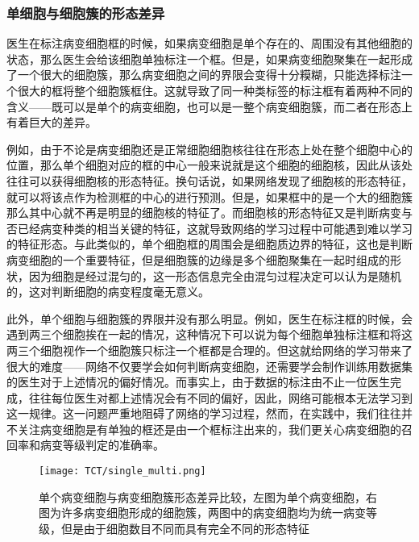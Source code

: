 \subsubsection{单细胞与细胞簇的形态差异}
\label{par:单细胞与细胞簇的形态差异}
\par 医生在标注病变细胞框的时候，如果病变细胞是单个存在的、周围没有其他细胞的状态，那么医生会给该细胞单独标注一个框。但是，如果病变细胞聚集在一起形成了一个很大的细胞簇，那么病变细胞之间的界限会变得十分糢糊，只能选择标注一个很大的框将整个细胞簇框住。这就导致了同一种类标签的标注框有着两种不同的含义——既可以是单个的病变细胞，也可以是一整个病变细胞簇，而二者在形态上有着巨大的差异。
\par 例如，由于不论是病变细胞还是正常细胞细胞核往往在形态上处在整个细胞中心的位置，那么单个细胞对应的框的中心一般来说就是这个细胞的细胞核，因此从该处往往可以获得细胞核的形态特征。换句话说，如果网络发现了细胞核的形态特征，就可以将该点作为检测框的中心的进行预测。但是，如果框中的是一个大的细胞簇那么其中心就不再是明显的细胞核的特征了。而细胞核的形态特征又是判断病变与否已经病变种类的相当关键的特征，这就导致网络的学习过程中可能遇到难以学习的特征形态。与此类似的，单个细胞框的周围会是细胞质边界的特征，这也是判断病变细胞的一个重要特征，但是细胞簇的边缘是多个细胞聚集在一起时组成的形状，因为细胞是经过混匀的，这一形态信息完全由混匀过程决定可以认为是随机的，这对判断细胞的病变程度毫无意义。
\par 此外，单个细胞与细胞簇的界限并没有那么明显。例如，医生在标注框的时候，会遇到两三个细胞挨在一起的情况，这种情况下可以说为每个细胞单独标注框和将这两三个细胞视作一个细胞簇只标注一个框都是合理的。但这就给网络的学习带来了很大的难度——网络不仅要学会如何判断病变细胞，还需要学会制作训练用数据集的医生对于上述情况的偏好情况。而事实上，由于数据的标注由不止一位医生完成，往往每位医生对都上述情况会有不同的偏好，因此，网络可能根本无法学习到这一规律。这一问题严重地阻碍了网络的学习过程，然而，在实践中，我们往往并不关注病变细胞是有单独的框还是由一个框标注出来的，我们更关心病变细胞的召回率和病变等级判定的准确率。
\begin{figure}[h]
    \centering
    \texttt{[image: TCT/single\_multi.png]}
    \caption{单个病变细胞与病变细胞簇形态差异比较，左图为单个病变细胞，右图为许多病变细胞形成的细胞簇，两图中的病变细胞均为统一病变等级，但是由于细胞数目不同而具有完全不同的形态特征}
    \label{论文形态差异}
\end{figure}
